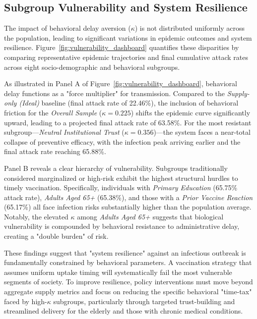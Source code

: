 \subsection{Subgroup Vulnerability and System Resilience}
\label{subsec:subgroup_resilience}

The impact of behavioral delay aversion ($\kappa$) is not distributed uniformly across the population, leading to significant variations in epidemic outcomes and system resilience. Figure~\ref{fig:vulnerability_dashboard} quantifies these disparities by comparing representative epidemic trajectories and final cumulative attack rates across eight socio-demographic and behavioral subgroups.

As illustrated in Panel A of Figure~\ref{fig:vulnerability_dashboard}, behavioral delay functions as a "force multiplier" for transmission. Compared to the \textit{Supply-only (Ideal)} baseline (final attack rate of 22.46\%), the inclusion of behavioral friction for the \textit{Overall Sample} ($\kappa = 0.225$) shifts the epidemic curve significantly upward, leading to a projected final attack rate of 63.58\%. For the most resistant subgroup---\textit{Neutral Institutional Trust} ($\kappa = 0.356$)---the system faces a near-total collapse of preventive efficacy, with the infection peak arriving earlier and the final attack rate reaching 65.88\%.

Panel B reveals a clear hierarchy of vulnerability. Subgroups traditionally considered marginalized or high-risk exhibit the highest structural hurdles to timely vaccination. Specifically, individuals with \textit{Primary Education} (65.75\% attack rate), \textit{Adults Aged 65+} (65.38\%), and those with a \textit{Prior Vaccine Reaction} (65.17\%) all face infection risks substantially higher than the population average. Notably, the elevated $\kappa$ among \textit{Adults Aged 65+} suggests that biological vulnerability is compounded by behavioral resistance to administrative delay, creating a "double burden" of risk.

These findings suggest that "system resilience" against an infectious outbreak is fundamentally constrained by behavioral parameters. A vaccination strategy that assumes uniform uptake timing will systematically fail the most vulnerable segments of society. To improve resilience, policy interventions must move beyond aggregate supply metrics and focus on reducing the specific behavioral "time-tax" faced by high-$\kappa$ subgroups, particularly through targeted trust-building and streamlined delivery for the elderly and those with chronic medical conditions.
